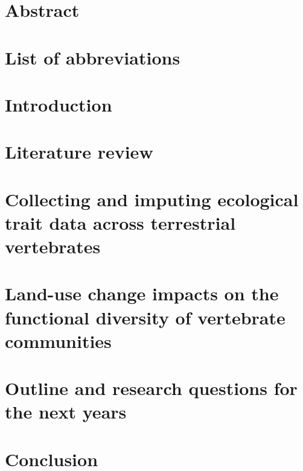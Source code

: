 \documentclass[11pt]{report}
\begin{document}




\chapter*{Abstract}


\clearpage
\tableofcontents


\clearpage
\listoftables

\listoffigures



\chapter*{List of abbreviations}


\clearpage
\chapter{Introduction}
%

\chapter{Literature review}
%

\pagebreak
\chapter{Collecting and imputing ecological trait data across terrestrial vertebrates}


\chapter{Land-use change impacts on the functional diversity of vertebrate communities}


\chapter{Outline and research questions for the next years}

\chapter{Conclusion}
\end{document}
